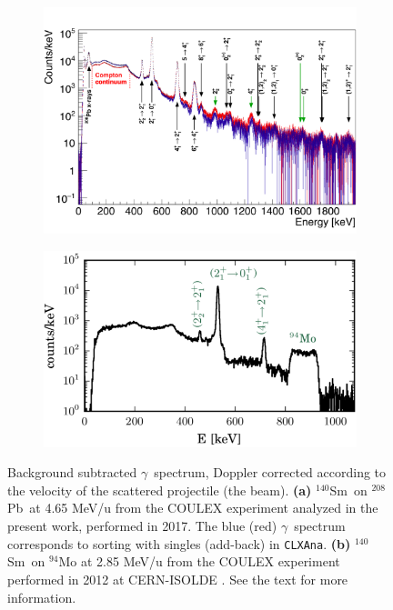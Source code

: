 \documentclass[twoside,english]{uiofysmaster/uiofysmaster}
\newcommand{\blank}[1]{\hspace*{#1}} %
\newcommand{\Sm}{$^{140}$Sm} %
\newcommand{\Pb}{$^{208}$Pb}
\newcommand{\ga}{$\gamma$}
\begin{document}
\begin{figure}[h!t]
	\centering
	\begin{subfigure}[t]{\textwidth}
		\centering
		\includegraphics[width=\textwidth]{../Plots/plotting/gam_dcB_s_and_a.png}
		\caption{}
		\label{fig:gam_dcB}
	\end{subfigure}
	\begin{subfigure}[t]{0.8\textwidth}
		\includegraphics[width=\textwidth]{Images/gam_MK.png}
		\caption{}
		\label{fig:gam_MK}
	\end{subfigure}
	\caption{Background subtracted \ga\ spectrum, Doppler corrected according to the velocity of the scattered projectile (the beam).
		\textbf{(a)} \Sm\ on \Pb\ at 4.65 MeV/u from the COULEX experiment analyzed in the present work, performed in 2017.
	 	The blue (red) \ga\ spectrum corresponds to sorting with singles (add-back) in \texttt{CLXAna}.
		\textbf{(b)} \Sm\ on $^{94}$Mo at 2.85 MeV/u from the COULEX experiment performed in 2012 at CERN-ISOLDE \cite{Klintefjord}. 
		See the text for more information. 	
	 	}
	\label{fig:gam_compared}
\end{figure}
\end{document}
